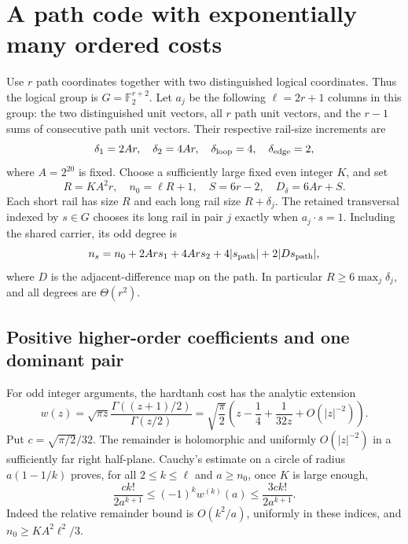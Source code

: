 \section{A path code with exponentially many ordered costs}
\label{sec:path-code}

Use $r$ path coordinates together with two distinguished logical
coordinates. Thus the logical group is
$G=\mathbb F_2^{r+2}$. Let $a_j$ be the following $\ell=2r+1$
columns in this group: the two distinguished unit vectors, all $r$
path unit vectors, and the $r-1$ sums of consecutive path unit vectors.
Their respective rail-size increments are
\[
 \delta_1=2Ar,\quad \delta_2=4Ar,\quad
 \delta_{\rm loop}=4,\quad\delta_{\rm edge}=2,
\]
where $A=2^{20}$ is fixed. Choose a sufficiently large fixed even
integer $K$, and set
\[
 R=KA^2r,\quad n_0=\ell R+1,\quad
 S=6r-2,\quad D_\delta=6Ar+S.
\]
Each short rail has size $R$ and each long rail size $R+\delta_j$.
The retained transversal indexed by $s\in G$ chooses its long rail
in pair $j$ exactly when $a_j\cdot s=1$. Including the shared carrier,
its odd degree is
\begin{equation}\label{eq:path-degree}
 n_s=n_0+2Ars_1+4Ars_2+4|s_{\rm path}|
                  +2|Ds_{\rm path}|,
\end{equation}
where $D$ is the adjacent-difference map on the path. In particular
$R\ge6\max_j\delta_j$, and all degrees are $\Theta(r^2)$.

\subsection{Positive higher-order coefficients and one dominant pair}

For odd integer arguments, the hardtanh cost has the analytic extension
\[
 w(z)=\sqrt{\pi z}\frac{\Gamma((z+1)/2)}{\Gamma(z/2)}
 =\sqrt{\frac\pi2}\left(z-\frac14+\frac1{32z}+O(|z|^{-2})\right).
\]
Put $c=\sqrt{\pi/2}/32$. The remainder is holomorphic and uniformly
$O(|z|^{-2})$ in a sufficiently far right half-plane. Cauchy's
estimate on a circle of radius $a(1-1/k)$ proves, for all
$2\le k\le\ell$ and $a\ge n_0$, once $K$ is large enough,
\begin{equation}\label{eq:path-derivative}
 \frac{ck!}{2a^{k+1}}\le(-1)^kw^{(k)}(a)
                  \le\frac{3ck!}{2a^{k+1}}.
\end{equation}
Indeed the relative remainder bound is $O(k^2/a)$, uniformly in
these indices, and $n_0\ge KA^2\ell^2/3$.

